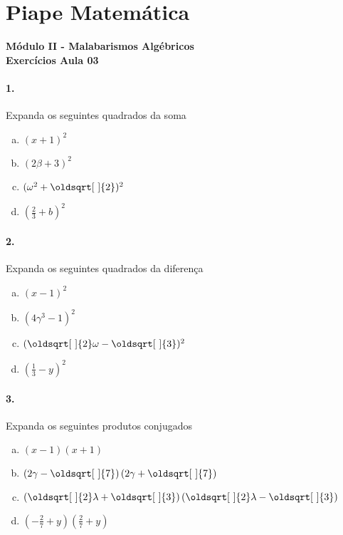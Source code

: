 \documentclass[a4paper,12pt]{article}
\renewcommand*{\sqrt}[2][\ ]{\oldsqrt[#1]{#2}}
\begin{document}
 
  
\section*{Piape Matemática} 
\textbf{Módulo II - Malabarismos Algébricos}\\
\textbf{Exercícios Aula 03}         
\begin{multicols}{2}
\paragraph{1.} Expanda os seguintes quadrados da soma
\begin{enumerate}[a)]
\item $(x + 1)^2$
\item $(2\beta + 3)^2$
\item $(\omega^2 + \sqrt{2})^2$
\item $\left(\frac{2}{3} + b\right)^2$
\end{enumerate} 

\paragraph{2.} Expanda os seguintes quadrados da diferença
\begin{enumerate}[a)]
\item $(x - 1)^2$
\item $(4\gamma^3 - 1)^2$
\item $(\sqrt{2}\omega - \sqrt{3})^2$
\item $\left(\frac{1}{3} - y\right)^2$
\end{enumerate} 

\paragraph{3.} Expanda os seguintes produtos conjugados
\begin{enumerate}[a)]
\item $(x - 1)(x + 1)$
\item $\left(2\gamma - \sqrt{7}\right)\left(2\gamma + \sqrt{7}\right)$
\item $\left(\sqrt{2}\lambda + \sqrt{3}\right)\left(\sqrt{2}\lambda - \sqrt{3}\right)$
\item $\left(-\frac{2}{7} + y\right)\left(\frac{2}{7} + y\right)$
\end{enumerate}  

\end{multicols}
\end{document}
